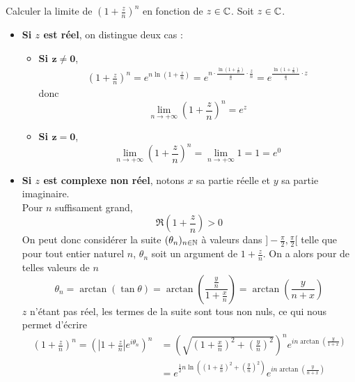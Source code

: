 \documentclass{article}
\renewenvironment{question_kholle}[2][ ]
{
	\subsection{\texorpdfstring{#2}{}}
	\notblank{#1}
	{
		\noindent #1
		\bigbreak
	}
	{}
	\begin{proof}
}
{
	\end{proof}
}
\begin{document}
\begin{question_kholle}{Calculer la limite de $\displaystyle
			\left(1+\frac{z}{n}\right)^{n}$ en fonction de $z\in\mathbb C$.}
	Soit $z\in\mathbb C$.
	\begin{itemize}[label=$\star$]
		\item \textbf{Si $z$ est réel}, on distingue deux cas :
		      \begin{itemize}
			      \item \textbf{Si $\bm{z\neq 0}$},
			            \begin{align*}
				            \left(1+\frac{z}{n}\right)^{n} = e^{n\ln
						            \left(1+\frac{z}{n}\right)} = e^{n\cdot \frac{\ln \left(1+
							            \frac{z}{n}\right)}{\frac{z}{n}}\cdot \frac{z}{n}} =
				            e^{\frac{\ln \left(1+\frac{z}{n}\right)}{\frac{z}{n}}\cdot z}
			            \end{align*}
			            donc
			            \[
				            \lim_{n\to +\infty} \left(1+\frac{z}{n}\right)^{n} = e^{z}
			            \]
			      \item \textbf{Si $\bm{z=0}$},
			            \[
				            \lim_{n\to+\infty}\left(1+\frac{z}{n}\right)^{n} =
				            \lim_{n\to+\infty}1=1=e^{0}
			            \]
		      \end{itemize}
		\item \textbf{Si $z$ est complexe non réel}, notons $x$ sa partie réelle et $y$ sa partie imaginaire.\\
		      Pour $n$ suffisament grand,
		      \[
			      \Re \left(1+\frac{z}{n}\right) > 0
		      \]
		      On peut donc considérer la suite $(\theta_{n})_{n\in\mathbb N}$ à valeurs dans $]-\frac{\pi}{2}, \frac{\pi}{2}[$ telle que pour tout entier naturel $n$, $\theta_{n}$ soit un argument de $1+\frac{z}{n}$. On a alors pour de telles valeurs de $n$
		      \[
			      \theta_{n} = \arctan(\tan \theta) = \arctan \left(\frac{\frac{y}{n}}{1+\frac{x}{n}}\right) = \arctan \left(\frac{y}{n+x}\right)
		      \]
		      $z$ n’étant pas réel, les termes de la suite sont tous non nuls, ce qui nous permet d’écrire
		      \begin{align*}
			      \left(1+\frac{z}{n}\right)^{n} = \left(\left|1+\frac{z}{n}\right|e^{i \theta_{n}}\right)^{n} & = \left(\sqrt{\left(1+\frac{x}{n}\right)^{2} + \left(\frac{y}{n}\right)^{2}}\right)^{n} e^{in\arctan \left(\frac{y}{1+x}\right)} \\ &= e^{\frac{1}{2}n \ln \left(\left(1+\frac{x}{n}\right)^{2} + \left(\frac{y}{n}\right)^{2}\right)} e^{in\arctan \left(\frac{y}{n+x}\right)}

\end{align*}
\end{itemize}
\end{question_kholle}
\end{document}
